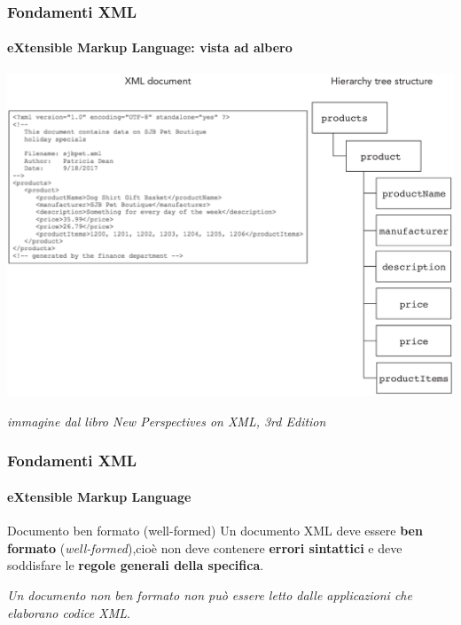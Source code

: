 \begin{frame}
	\frametitle{Fondamenti XML}
	\framesubtitle{eXtensible Markup Language: vista ad albero}
	\addtocounter{nframe}{1}

	\begin{center}
		\includegraphics[width=.9\textwidth]{imgs/XML-TreeStructure.png}
	\end{center}

\begin{tiny}\textit{immagine dal libro New Perspectives on XML, 3rd Edition}\end{tiny}

\end{frame}


	




\begin{frame}
	\frametitle{Fondamenti XML}
	\framesubtitle{eXtensible Markup Language}
	\addtocounter{nframe}{1}

	\begin{block}{Documento ben formato (well-formed)}
		Un documento XML deve essere \textbf{ben formato} (\textit{well-formed}),cioè non deve contenere \textbf{errori sintattici} e deve soddisfare le \textbf{regole generali della specifica}.
	\end{block}
	\textit{Un documento non ben formato non può essere letto dalle applicazioni che elaborano codice XML}.

\end{frame}


